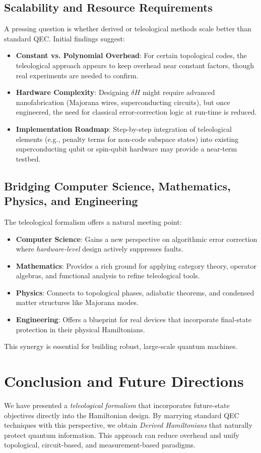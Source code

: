 \documentclass[11pt]{article}
\begin{document}
\subsection{Scalability and Resource Requirements}
A pressing question is whether derived or teleological methods scale better than standard QEC. Initial findings suggest:
\begin{itemize}
\item \textbf{Constant vs. Polynomial Overhead}: For certain topological codes, the teleological approach appears to keep overhead near constant factors, though real experiments are needed to confirm.
\item \textbf{Hardware Complexity}: Designing $\delta H$ might require advanced nanofabrication (Majorana wires, superconducting circuits), but once engineered, the need for classical error-correction logic at run-time is reduced.
\item \textbf{Implementation Roadmap}: Step-by-step integration of teleological elements (e.g., penalty terms for non-code subspace states) into existing superconducting qubit or spin-qubit hardware may provide a near-term testbed.
\end{itemize}

\subsection{Bridging Computer Science, Mathematics, Physics, and Engineering}
The teleological formalism offers a natural meeting point:
\begin{itemize}
\item \textbf{Computer Science}: Gains a new perspective on algorithmic error correction where \emph{hardware-level} design actively suppresses faults.
\item \textbf{Mathematics}: Provides a rich ground for applying category theory, operator algebras, and functional analysis to refine teleological tools.
\item \textbf{Physics}: Connects to topological phases, adiabatic theorems, and condensed matter structures like Majorana modes.
\item \textbf{Engineering}: Offers a blueprint for real devices that incorporate final-state protection in their physical Hamiltonians.
\end{itemize}

This synergy is essential for building robust, large-scale quantum machines.

\section{Conclusion and Future Directions}
We have presented a \emph{teleological formalism} that incorporates future-state objectives directly into the Hamiltonian design. By marrying standard QEC techniques with this perspective, we obtain \emph{Derived Hamiltonians} that naturally protect quantum information. This approach can reduce overhead and unify topological, circuit-based, and measurement-based paradigms.
\end{document}
